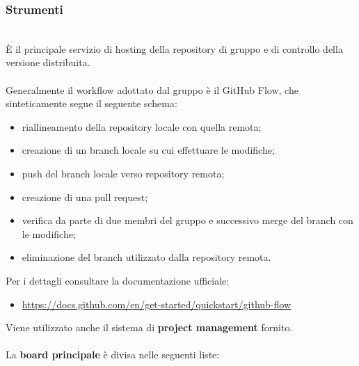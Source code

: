 \subsubsection{Strumenti}
\\
È il principale servizio di hosting della repository di gruppo e di controllo della versione distribuita. 
\\\\
Generalmente il workflow adottato dal gruppo è il GitHub Flow, che sinteticamente segue il seguente schema:
\begin{itemize}
  \item riallineamento della repository locale con quella remota;
  \item creazione di un branch locale su cui effettuare le modifiche;
  \item push del branch locale verso repository remota;
  \item creazione di una pull request;
  \item verifica da parte di due membri del gruppo e successivo merge del branch con le modifiche;
  \item eliminazione del branch utilizzato dalla repository remota.
\end{itemize}
Per i dettagli consultare la documentazione ufficiale: 
\begin{itemize}
  \item \underline{https://docs.github.com/en/get-started/quickstart/github-flow}
\end{itemize}
\medskip
Viene utilizzato anche il sistema di \textbf{project management} fornito.\\\\
La \textbf{board principale} è divisa nelle seguenti liste:
